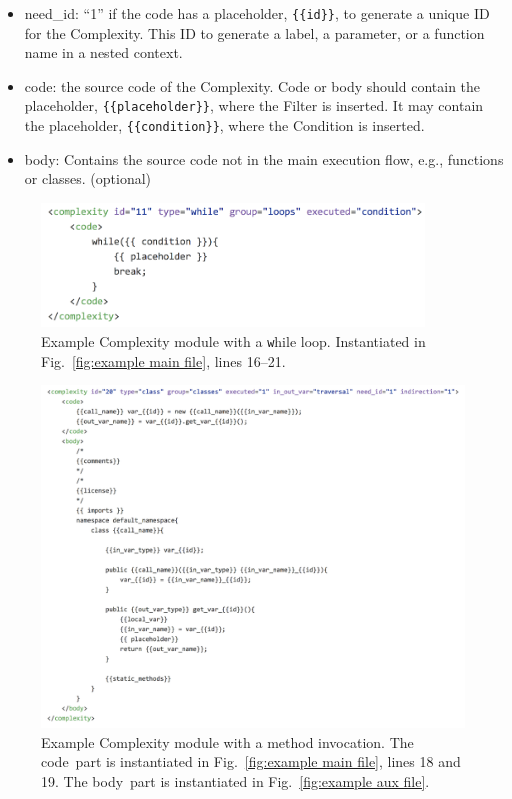 \documentclass[12pt]{article}
\begin{document}
\begin{itemize}
    \item need\_id: ``1'' if the code has a placeholder, \verb|{{id}}|,
    to generate a unique ID for the Complexity.  This ID to generate 
    a label, a parameter, or a function name in a nested
    context.

    \item code: the source code of the Complexity.  Code or 
    body should contain the placeholder, \verb|{{placeholder}}|, 
    where the Filter is inserted.  It may contain the
    placeholder, \verb|{{condition}}|, where the Condition 
    is inserted.

    \item body:  Contains the source code not in the main execution 
    flow, e.g., 
    functions or classes. (optional)
\end{itemize}


\begin{figure}[htbp]
  \includegraphics[width=4in]{fig_Complexity_file_while.png}
  \caption{Example Complexity module with a {\texttt while} loop.  Instantiated in 
    Fig.~\ref{fig:example main file}, lines 16--21.}
  \label{fig:example complexity-while file}
\end{figure}

\begin{figure}[htbp]
  \includegraphics[width=\linewidth]{fig_Complexity_file_method.png}
  \caption{Example Complexity module with a method invocation.  
  The \texlangle code\texrangle\ part is instantiated in
  Fig.~\ref{fig:example main file}, lines 18 and 19. 
  The \texlangle body\texrangle\ part is instantiated in
  Fig.~\ref{fig:example aux file}.}
  \label{fig:example complexity-method file}
\end{figure}
\end{document}
